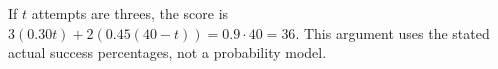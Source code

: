 If $t$ attempts are threes, the score is $3(0.30t)+2(0.45(40-t))=0.9\cdot40=\boxed{36}$. This argument uses the stated actual success percentages, not a probability model.
